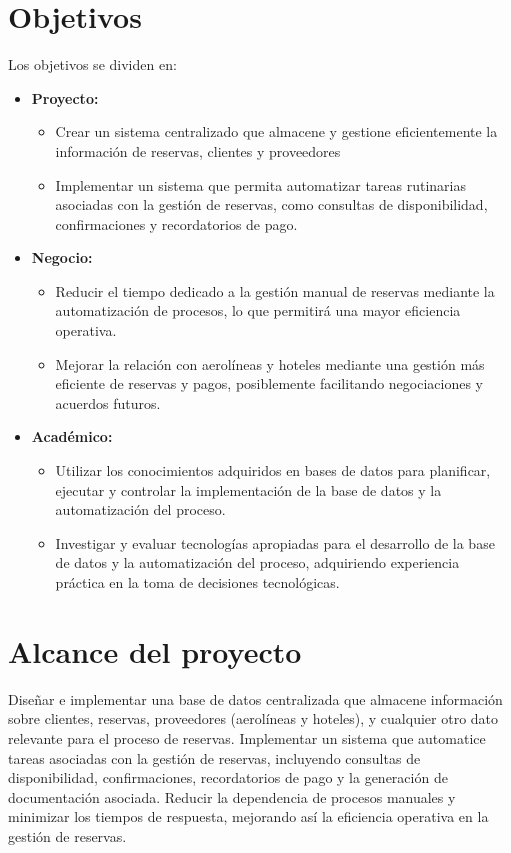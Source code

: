 \documentclass{article}
\begin{document}
\section{Objetivos}
Los objetivos se dividen en:
\begin{itemize}
    \item \textbf{Proyecto:} 
    \begin{itemize}
        \item Crear un sistema centralizado que almacene y gestione eficientemente la información de reservas, clientes y proveedores
        \item Implementar un sistema que permita automatizar tareas rutinarias asociadas con la gestión de reservas, como consultas de disponibilidad, confirmaciones y recordatorios de pago.
    \end{itemize}
    \item \textbf{Negocio:}
    \begin{itemize}
        \item Reducir el tiempo dedicado a la gestión manual de reservas mediante la automatización de procesos, lo que permitirá una mayor eficiencia operativa.
        \item Mejorar la relación con aerolíneas y hoteles mediante una gestión más eficiente de reservas y pagos, posiblemente facilitando negociaciones y acuerdos futuros.
    \end{itemize}
    \item \textbf{Académico:}
    \begin{itemize}
        \item Utilizar los conocimientos adquiridos en bases de datos para planificar, ejecutar y controlar la implementación de la base de datos y la automatización del proceso.
        \item Investigar y evaluar tecnologías apropiadas para el desarrollo de la base de datos y la automatización del proceso, adquiriendo experiencia práctica en la toma de decisiones tecnológicas.
    \end{itemize}
\end{itemize}

\newpage
\section{Alcance del proyecto}
Diseñar e implementar una base de datos centralizada que almacene información sobre clientes, reservas, proveedores (aerolíneas y hoteles), y cualquier otro dato relevante para el proceso de reservas. Implementar un sistema que automatice tareas asociadas con la gestión de reservas, incluyendo consultas de disponibilidad, confirmaciones, recordatorios de pago y la generación de documentación asociada. Reducir la dependencia de procesos manuales y minimizar los tiempos de respuesta, mejorando así la eficiencia operativa en la gestión de reservas.
\end{document}

